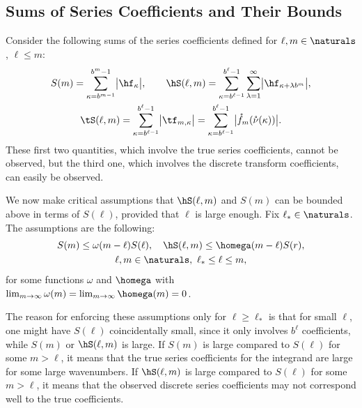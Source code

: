 \documentclass[]{elsarticle}
\theoremstyle{definition}
\newcommand{\rnu}{\mathring{\nu}}
\begin{document}
\subsection{Sums of Series Coefficients and Their Bounds}
Consider the following sums of the series coefficients defined for $\ell,m \in \naturals$, $\ell \le m$:
\begin{gather*}
S(m) =  \sum_{\kappa=b^{m-1}}^{b^{m}-1} \bigl \lvert \hf_{\kappa} \bigr \rvert, \qquad
\hS(\ell,m)  = \sum_{\kappa=b^{\ell-1}}^{b^{\ell}-1} \sum_{\lambda=1}^{\infty} \bigl \lvert \hf_{\kappa+\lambda b^{m}}\bigr\rvert, \\
\tS(\ell,m) = \sum_{\kappa=b^{\ell-1}}^{b^{\ell}-1} \bigl \lvert \tf_{m,\kappa}\bigr\rvert = \sum_{\kappa=b^{\ell-1}}^{b^{\ell}-1} \bigl \lvert \mathring{f}_m(\rnu(\kappa)) \bigr\rvert .
\end{gather*}
These first two quantities, which involve the true series coefficients, cannot be observed, but the third one, which involves the discrete transform coefficients, can easily be observed.

We now make critical assumptions that $\hS(\ell,m)$ and $S(m)$ can be bounded above in terms of $S(\ell)$, provided that $\ell$ is large enough.  Fix $\ell_* \in \naturals$.  The assumptions are the following:
\begin{multline}
S(m) \le \omega(m-\ell) S(\ell), \quad \hS(\ell,m) \le \homega(m-\ell) S(r), \\
\ell,m \in \naturals, \ \ell_* \le \ell \le m,
\end{multline}
for some functions $\omega$ and $\homega$ with $\lim_{m \to \infty} \omega(m) = \lim_{m \to \infty} \homega(m) = 0$.

The reason for enforcing these assumptions only  for $\ell \ge \ell_*$ is that for small $\ell$, one might have $S(\ell)$ coincidentally small, since it only involves $b^\ell$ coefficients, while $S(m)$ or $\hS(\ell,m)$ is large.  If $S(m)$ is large compared to $S(\ell)$ for some $m > \ell$, it means that the true series coefficients for the integrand are large for some large wavenumbers.  If $\hS(\ell,m)$ is large compared to $S(\ell)$ for some $m > \ell$, it means that the observed discrete series coefficients may not correspond well to the true coefficients.
\end{document}
